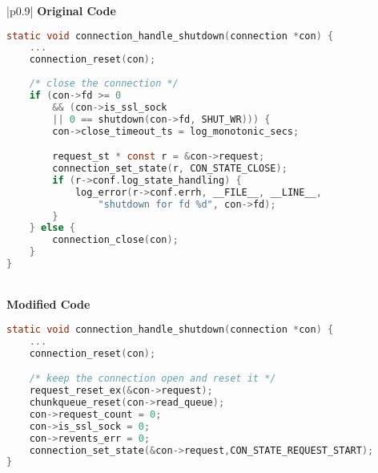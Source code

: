 \begin{table}[H]
\centering
\begin{tabular}{|p{}|}
\hline
\textbf{Original Code} \\
\hline
\begin{lstlisting}[language=c, basicstyle=\footnotesize, breaklines=true]
static void connection_handle_shutdown(connection *con) {
    ...
    connection_reset(con);
    
    /* close the connection */
    if (con->fd >= 0 
        && (con->is_ssl_sock 
        || 0 == shutdown(con->fd, SHUT_WR))) {
        con->close_timeout_ts = log_monotonic_secs;

        request_st * const r = &con->request;
        connection_set_state(r, CON_STATE_CLOSE);
        if (r->conf.log_state_handling) {
            log_error(r->conf.errh, __FILE__, __LINE__,
                "shutdown for fd %d", con->fd);
        }
    } else {
        connection_close(con);
    }
}
\end{lstlisting} \\
\hline
\textbf{Modified Code} \\
\hline
\begin{lstlisting}[language=c, basicstyle=\footnotesize, breaklines=true]
static void connection_handle_shutdown(connection *con) {
    ...
    connection_reset(con);

    /* keep the connection open and reset it */
    request_reset_ex(&con->request);
    chunkqueue_reset(con->read_queue);
    con->request_count = 0;
    con->is_ssl_sock = 0;
    con->revents_err = 0;
    connection_set_state(&con->request,CON_STATE_REQUEST_START);
}
\end{lstlisting} \\
\hline
\end{tabular}
\caption{Comparison of Original and Modified Code for `src/connections.c`}
\label{tab:connections_patch}
\end{table}

